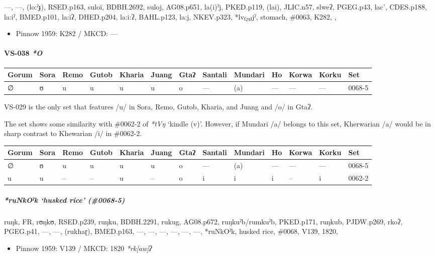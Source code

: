 \documentclass[a4paper,]{article}
\providecommand{\tightlist}{%
  \setlength{\itemsep}{0pt}\setlength{\parskip}{0pt}}
\let\oldparagraph\paragraph
\renewcommand{\paragraph}[1]{\oldparagraph{#1}\mbox{}}
\let\oldsubparagraph\subparagraph
\renewcommand{\subparagraph}[1]{\oldsubparagraph{#1}\mbox{}}
\begin{document}
---, ---, (lo:ˀɟ), RSED.p163, suloĭ, BDBH.2692, suloj, AG08.p651,
la(i)ˀj, PKED.p119, (lai), JLIC.n57, slweʔ, PGEG.p43, lac', CDES.p188,
la:iˀ, BMED.p101, la:iʔ, DHED.p204, la:i:ʔ, BAHL.p123, la:j, NKEV.p323,
*lv₍₂₉₎jˀ, stomach, \#0063, K282, ,

\begin{itemize}
\tightlist
\item
  Pinnow 1959: K282 / MKCD: ---
\end{itemize}

\paragraph{\texorpdfstring{VS-038 \emph{*O}}{VS-038 *O}}\label{vs-038-o}

\begin{longtable}[]{@{}lllllllllllll@{}}
\toprule
Gorum & Sora & Remo & Gutob & Kharia & Juang & Gtaʔ & Santali & Mundari
& Ho & Korwa & Korku & Set\tabularnewline
\midrule
\endhead
∅ & ʊ & u & u & u & u & o & --- & (a) & --- & --- & --- &
0068-5\tabularnewline
\bottomrule
\end{longtable}

VS-029 is the only set that features /u/ in Sora, Remo, Gutob, Kharia,
and Juang and /o/ in Gtaʔ.

The set shows some similarity with \#0062-2 of \emph{*tVŋ} `kindle (v)'.
However, if Mundari /a/ belongs to this set, Kherwarian /a/ would be in
sharp contrast to Khewarian /i/ in \#0062-2.

\begin{longtable}[]{@{}lllllllllllll@{}}
\toprule
Gorum & Sora & Remo & Gutob & Kharia & Juang & Gtaʔ & Santali & Mundari
& Ho & Korwa & Korku & Set\tabularnewline
\midrule
\endhead
∅ & ʊ & u & u & u & u & o & --- & (a) & --- & --- & --- &
0068-5\tabularnewline
u & u & -- & -- & u & -- & o & i & i & i & -- & i &
0062-2\tabularnewline
\bottomrule
\end{longtable}

\subparagraph{\texorpdfstring{\emph{*ruNkOˀk} `husked rice'
(\#0068-5)}{*ruNkOˀk husked rice (\#0068-5)}}\label{runkoux2c0k-husked-rice-0068-5}

ruŋk, FR, rʊŋkʊ, RSED.p239, ruŋku, BDBH.2291, rukug, AG08.p672,
ruŋkuˀb/rumkuˀb, PKED.p171, ruŋkub, PJDW.p269, rkoʔ, PGEG.p41, ---, ---,
(rukhaɽ), BMED.p163, ---, ---, ---, ---, ---, ---, *ruNkOˀk, husked
rice, \#0068, V139, 1820,

\begin{itemize}
\tightlist
\item
  Pinnow 1959: V139 / MKCD: 1820 \emph{*rk{[}aw{]}ʔ}
\end{itemize}
\end{document}

